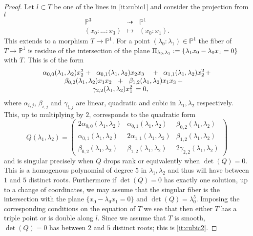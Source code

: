 \documentclass[a4paper,11pt]{amsart}
\def\det{\operatorname{det}}
\def\det{\operatorname{det}}
\newcommand{\PP}{\mathbb{P}}
\newcommand{\defeq}{\vcentcolon=}
\newcommand{\rmap}{\dashrightarrow}
\begin{document}
\begin{proof}
	Let $l \subset T$ be one of the lines in \eqref{it:cubic1} and consider the projection from $l$
	\[
	\begin{array}{ccc}
		\PP^3 &\rmap & \PP^1\\
		(x_0:\ldots:x_3) & \mapsto & (x_0:x_1).
	\end{array}
	\]
	This extends to a morphism $T \to \PP^1$.
	For a point $(\lambda_0:\lambda_1) \in \PP^1$ the fiber of $T \to \PP^1$ is residue of the intersection of the plane $\Pi_{\lambda_0,\lambda_1} \defeq \{\lambda_1 x_0 - \lambda_0 x_1 = 0\}$ with $T$.
	This is of the form
	\[\arraycolsep=-.5cm
	\begin{array}{ccccc}
		\alpha_{0,0}(\lambda_1,\lambda_2)x_2^2 & + & \alpha_{0,1}(\lambda_1,\lambda_2)x_2x_3 & + & \alpha_{1,1}(\lambda_1,\lambda_2)x_2^2 \,+\\
		&\beta_{0,2}(\lambda_1,\lambda_2)x_1x_2 &+& \beta_{1,2}(\lambda_1,\lambda_2)x_1x_3 \,+\\
		&&\gamma_{2,2}(\lambda_1,\lambda_2) x_1^2\, =0,
	\end{array}
	\]
	where $\alpha_{i,j}$, $\beta_{i,j}$ and $\gamma_{i,j}$ are linear, quadratic and cubic in $\lambda_1,\lambda_2$ respectively.
	This, up to multiplying by $2$, corresponds to the quadratic form
	\[
	Q(\lambda_1,\lambda_2) = 
	\left(
	\begin{array}{ccc}
		2\alpha_{0,0}(\lambda_1,\lambda_2) & \alpha_{0,1}(\lambda_1,\lambda_2) & \beta_{0,2}(\lambda_1,\lambda_2)\\
		\alpha_{0,1}(\lambda_1,\lambda_2) & 2\alpha_{1,1}(\lambda_1,\lambda_2) & \beta_{1,2}(\lambda_1,\lambda_2)\\
		\beta_{0,2}(\lambda_1,\lambda_2) & \beta_{1,2}(\lambda_1,\lambda_2) & 2\gamma_{2,2}(\lambda_1,\lambda_2)
	\end{array}
	\right)
	\]
	and is singular precisely when $Q$ drops rank or equivalently when $\det(Q) = 0$.
	This is a homogenous polynomial of degree $5$ in $\lambda_1,\lambda_2$ and thus will have between $1$ and $5$ distinct roots.
	Furthermore if $\det(Q) = 0$ has exactly one solution, up to a change of coordinates, we may assume that the singular fiber is  the intersection with the plane $\{x_0 - \lambda_0x_1 = 0\}$ and $\det(Q) = \lambda_0^5$.
	Imposing the corresponding conditions on the equation of $T$ we see that then either $T$ has a triple point or is double along $l$.
	Since we assume that $T$ is smooth, $\det(Q) = 0$ has between $2$ and $5$ distinct roots;
	this is \eqref{it:cubic2}.
	

\end{proof}
\end{document}
